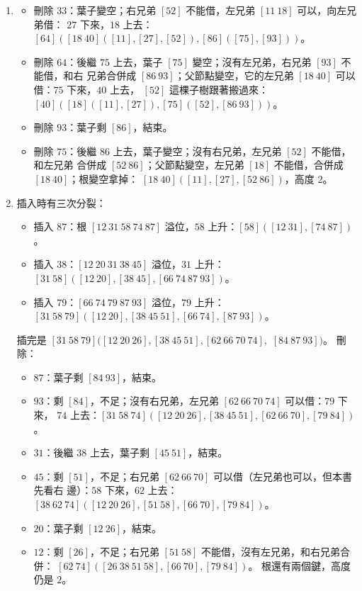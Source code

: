 \begin{enumerate}
\item
\begin{itemize}
\item 刪除 $33$：葉子變空；右兄弟 $[52]$ 不能借，左兄弟 $[11\ 18]$ 可以，向左兄弟借：
$27$ 下來，$18$ 上去：$[64]([18\ 40]([11],\allowbreak[27],\allowbreak[52]),[86]([75],\allowbreak[93]))$。
\item 刪除 $64$：後繼 $75$ 上去，葉子 $[75]$ 變空；沒有左兄弟，右兄弟 $[93]$ 不能借，和右
兄弟合併成 $[86\ 93]$；父節點變空，它的左兄弟 $[18\ 40]$ 可以借：$75$ 下來，$40$ 上去，
$[52]$ 這棵子樹跟著搬過來：$[40]([18]([11],\allowbreak[27]),[75]([52],\allowbreak[86\ 93]))$。
\item 刪除 $93$：葉子剩 $[86]$，結束。
\item 刪除 $75$：後繼 $86$ 上去，葉子變空；沒有右兄弟，左兄弟 $[52]$ 不能借，和左兄弟
合併成 $[52\ 86]$；父節點變空，左兄弟 $[18]$ 不能借，合併成 $[18\ 40]$；根變空拿掉：
$[18\ 40]([11],\allowbreak[27],\allowbreak[52\ 86])$，高度 $2$。
\end{itemize}

\item 插入時有三次分裂：
\begin{itemize}
\item 插入 $87$：根 $[12\ 31\ 58\ 74\ 87]$ 溢位，$58$ 上升：$[58]([12\ 31],\allowbreak[74\ 87])$。
\item 插入 $38$：$[12\ 20\ 31\ 38\ 45]$ 溢位，$31$ 上升：
$[31\ 58]([12\ 20],\allowbreak[38\ 45],\allowbreak[66\ 74\ 87\ 93])$。
\item 插入 $79$：$[66\ 74\ 79\ 87\ 93]$ 溢位，$79$ 上升：
$[31\ 58\ 79]([12\ 20],\allowbreak[38\ 45\ 51],\allowbreak[66\ 74],\allowbreak[87\ 93])$。
\end{itemize}
插完是 $[31\ 58\ 79]([12\ 20\ 26],\allowbreak[38\ 45\ 51],\allowbreak[62\ 66\ 70\ 74],$
$[84\ 87\ 93])$。 刪除：
\begin{itemize}
\item $87$：葉子剩 $[84\ 93]$，結束。
\item $93$：剩 $[84]$，不足；沒有右兄弟，左兄弟 $[62\ 66\ 70\ 74]$ 可以借：$79$ 下來，
$74$ 上去：$[31\ 58\ 74]([12\ 20\ 26],\allowbreak[38\ 45\ 51],\allowbreak[62\ 66\ 70],\allowbreak[79\ 84])$。
\item $31$：後繼 $38$ 上去，葉子剩 $[45\ 51]$，結束。
\item $45$：剩 $[51]$，不足；右兄弟 $[62\ 66\ 70]$ 可以借（左兄弟也可以，但本書先看右
邊）：$58$ 下來，$62$ 上去：$[38\ 62\ 74]([12\ 20\ 26],\allowbreak[51\ 58],\allowbreak[66\ 70],\allowbreak[79\ 84])$。
\item $20$：葉子剩 $[12\ 26]$，結束。
\item $12$：剩 $[26]$，不足；右兄弟 $[51\ 58]$ 不能借，沒有左兄弟，和右兄弟合併：
$[62\ 74]([26\ 38\ 51\ 58],\allowbreak[66\ 70],\allowbreak[79\ 84])$。 根還有兩個鍵，高度仍是 $2$。
\end{itemize}


\end{enumerate}
